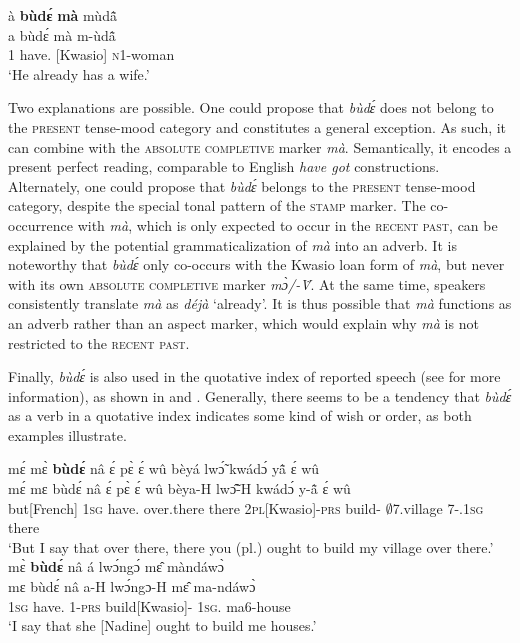 \ea \label{budema}
  \glll à {\bfseries bùdɛ́} {\bfseries mà} mùdã̂ \\
        a bùdɛ́ mà m-ùdã̂ \\
          1 have.{\R} {\COMPL}[Kwasio] \textsc{n}1-woman\\
    \trans `He already has a wife.'
\z

Two explanations are possible. One could propose that {\itshape bùdɛ́} does not belong to the \textsc{present} tense-mood category and constitutes a general exception. As such, it can combine with the \textsc{absolute completive} marker {\itshape mà}. Semantically, it encodes a present perfect reading, comparable to English {\itshape have got} constructions. Alternately, one could propose that {\itshape bùdɛ́} belongs to the \textsc{present} tense-mood category, despite the special tonal pattern of the \textsc{stamp} marker. The co-occurrence with {\itshape mà}, which is only expected to occur in the \textsc{recent past}, can be explained by the potential grammaticalization of {\itshape mà} into an adverb. It is noteworthy that {\itshape bùdɛ́} only co-occurs with the Kwasio loan form of {\itshape mà}, but never with its own \textsc{absolute completive} marker {\itshape mɔ̀/-Ṽ}. At the same time, speakers consistently translate {\itshape mà} as {\itshape déjà} `already'. It is thus possible that {\itshape mà} functions as an adverb rather than an aspect marker, which would explain why {\itshape mà} is not restricted to the \textsc{recent past}.


Finally, {\itshape bùdɛ́} is also used in the quotative index of reported speech (see  for more information), as shown in  and . Generally, there seems to be a tendency that {\itshape bùdɛ́} as a verb in a quotative index indicates some kind of wish or order, as both examples illustrate.

\ea \label{budeQI1}
  \glll  mɛ́ mɛ̀ {\bfseries bùdɛ́} nâ ɛ́ pɛ̀ ɛ́ wû bèyá lwɔ̃́ kwádɔ́ yã̂ ɛ́ wû \\
       mɛ́ mɛ bùdɛ́ nâ ɛ́ pɛ̀ ɛ́ wû bèya-H lwɔ̃̂-H kwádɔ́ y-ã̂ ɛ́ wû \\
         but[French] 1\textsc{sg} have.{\R} {\COMP} {\LOC} over.there {\LOC} there 2\textsc{pl}[Kwasio]-\textsc{prs} build-{\R} $\emptyset$7.village 7-{\POSS}.1\textsc{sg} {\LOC} there\\
    \trans `But I say that over there, there you (pl.) ought to build my village over there.'
\ex \label{budeQI2}
  \glll mɛ̀ {\bfseries bùdɛ́} nâ á lwɔ́ngɔ́ mɛ̂ màndáwɔ̀ \\
        mɛ bùdɛ́ nâ a-H lwɔ́ngɔ-H mɛ̂ ma-ndáwɔ̀ \\
       1\textsc{sg} have.{\R} {\COMP} 1-\textsc{prs} build[Kwasio]-{\R} 1\textsc{sg}.{\OBJ} ma6-house\\
    \trans `I say that she [Nadine] ought to build me houses.'
\z

